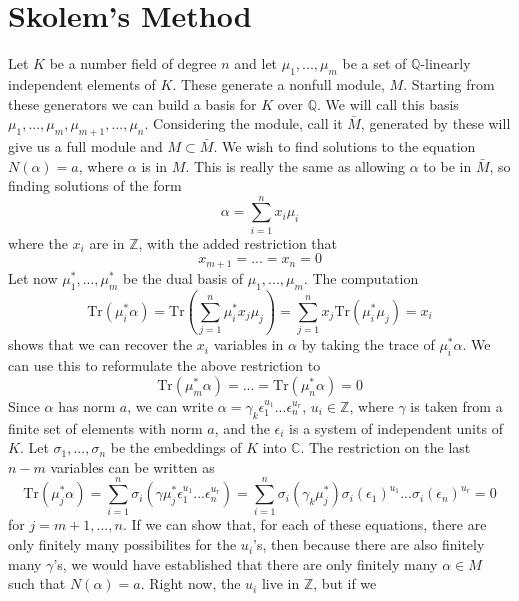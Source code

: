 \documentclass{article}
\newcommand{\mbb}[1]{\mathbb{#1}}
\newcommand{\tr}[1]{\text{Tr}(#1)}
\begin{document}
\section*{Skolem's Method}
Let $K$ be a number field of degree $n$ and let $\mu_1, ..., \mu_m$ be a set of $\mbb{Q}$-linearly independent elements of $K$. These generate a nonfull module, $M$. Starting from these generators we can build a basis for $K$ over $\mbb{Q}$. We will call this basis $\mu_1, ..., \mu_m, \mu_{m+1}, ..., \mu_n$. Considering the module, call it $\bar M$, generated by these will give us a full module and $M \subset \bar M$. We wish to find solutions to the equation $N(\alpha) = a$, where $\alpha$ is in $M$. This is really the same as allowing $\alpha$ to be in $\bar M$, so finding solutions of the form
$$\alpha = \sum_{i=1}^n x_i \mu_i$$
where the $x_i$ are in $\mbb{Z}$, with the added restriction that 
$$x_{m+1} = ... = x_n = 0$$
Let now $\mu_1^*, ..., \mu_m^*$ be the dual basis of $\mu_1, ..., \mu_m$. The computation 
$$\tr{\mu_i^* \alpha} = \tr {\sum_{j=1}^n \mu_i^* x_j \mu_j} = \sum_{j=1}^n x_j \tr{\mu_i^* \mu_j} = x_i$$
shows that we can recover the $x_i$ variables in $\alpha$ by taking the trace of $\mu_i^*\alpha$. We can use this to reformulate the above restriction to
$$\tr{\mu_m^* \alpha} = ... = \tr{\mu_n^* \alpha} = 0$$
Since $\alpha$ has norm $a$, we can write
$\alpha = \gamma_k \epsilon_1^{u_1}...\epsilon_n^{u_r}$, $u_i \in \mbb{Z}$, where $\gamma$ is taken from a finite set of elements with norm $a$, and the $\epsilon_i$ is a system of independent units of $K$. Let $\sigma_1, ..., \sigma_n$ be the embeddings of $K$ into $\mbb{C}$. The restriction on the last $n-m$ variables can be written as 
$$\tr{\mu_j^* \alpha } = \sum_{i = 1}^n \sigma_i(\gamma \mu_j^* \epsilon_1^{u_1}...\epsilon_n^{u_r}) = \sum_{i = 1}^n \sigma_i(\gamma_k \mu_j^* ) \sigma_i(\epsilon_1)^{u_1}...\sigma_i(\epsilon_n)^{u_r} = 0$$
for $j = m+1, ..., n$. If we can show that, for each of these equations, there are only finitely many possibilites for the $u_i$'s, then because there are also finitely many $\gamma$'s, we would have established that there are only finitely many $\alpha \in M$ such that $N(\alpha) = a$. Right now, the $u_i$ live in $\mbb{Z}$, but if we 
\end{document}
